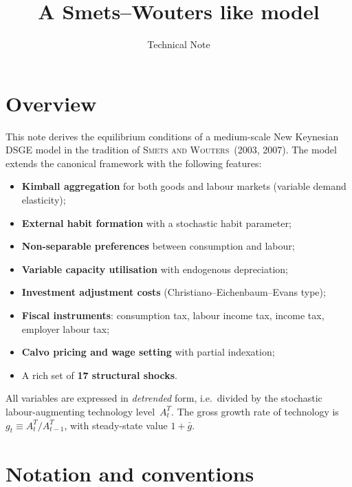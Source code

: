 \documentclass[11pt,a4paper]{article}
\title{A Smets--Wouters like model}
\author{Technical Note}
\date{}
\newcommand{\bbar}[1]{\bar{#1}}
\begin{document}
\maketitle
\tableofcontents
\newpage

\section{Overview}

This note derives the equilibrium conditions of a medium-scale New Keynesian
DSGE model in the tradition of \textsc{Smets and Wouters}~(2003, 2007). The
model extends the canonical framework with the following features:
\begin{itemize}[nosep]
  \item \textbf{Kimball aggregation} for both goods and labour markets (variable demand elasticity);
  \item \textbf{External habit formation} with a stochastic habit parameter;
  \item \textbf{Non-separable preferences} between consumption and labour;
  \item \textbf{Variable capacity utilisation} with endogenous depreciation;
  \item \textbf{Investment adjustment costs} (Christiano--Eichenbaum--Evans type);
  \item \textbf{Fiscal instruments}: consumption tax, labour income tax, income tax, employer labour tax;
  \item \textbf{Calvo pricing and wage setting} with partial indexation;
  \item A rich set of \textbf{17 structural shocks}.
\end{itemize}
All variables are expressed in \emph{detrended} form, i.e.\ divided by the
stochastic labour-augmenting technology level~$A_t^T$. The gross growth rate of
technology is $g_t \equiv A_t^T / A_{t-1}^T$, with steady-state value
$1 + \bbar{g}$.


\section{Notation and conventions}
\end{document}
